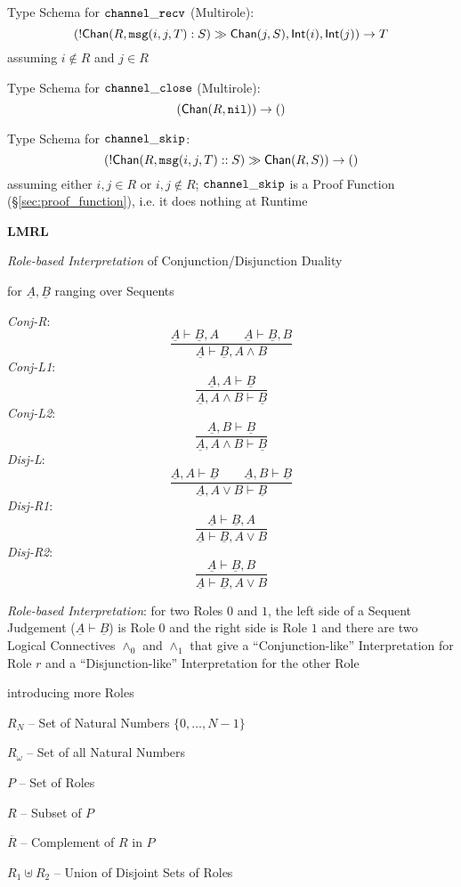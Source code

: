 Type Schema for $\mathtt{channel\_recv}$ (Multirole):
\[
  (!\mathsf{Chan} (R, \mathtt{msg}(i,j,T):S) \gg \mathsf{Chan}(j,S), \mathsf{Int}(i), \mathsf{Int}(j))
    \rightarrow T
\]
assuming $i \notin R$ and $j \in R$

Type Schema for $\mathtt{channel\_close}$ (Multirole):
\[
  (\mathsf{Chan}(R, \mathtt{nil})) \rightarrow \mathsf{()}
\]

Type Schema for $\mathtt{channel\_skip}$:
\[
  (!\mathsf{Chan}(R,\mathtt{msg}(i,j,T)::S) \gg \mathsf{Chan}(R,S)) \rightarrow \mathsf{()}
\]
assuming either $i,j \in R$ or $i,j \notin R$; $\mathtt{channel\_skip}$ is a
Proof Function (\S\ref{sec:proof_function}), i.e. it does nothing at
Runtime


\textbf{LMRL}

\emph{Role-based Interpretation} of Conjunction/Disjunction Duality

for $\underline{A},\underline{B}$ ranging over Sequents

\emph{Conj-R}:
\[
  \frac {\underline{A} \vdash \underline{B},A \quad\quad
    \underline{A} \vdash \underline{B},B}
  {\underline{A} \vdash \underline{B},A \wedge B}
\]
\emph{Conj-L1}:
\[
  \frac {\underline{A},A \vdash \underline{B}}
  {\underline{A},A \wedge B \vdash \underline{B}}
\]
\emph{Conj-L2}:
\[
  \frac {\underline{A},B \vdash \underline{B}}
  {\underline{A},A \wedge B \vdash \underline{B}}
\]
\emph{Disj-L}:
\[
  \frac {\underline{A},A \vdash \underline{B} \quad\quad
    \underline{A},B \vdash \underline{B}}
  {\underline{A},A \vee B \vdash \underline{B}}
\]
\emph{Disj-R1}:
\[
  \frac {\underline{A} \vdash \underline{B},A}
  {\underline{A} \vdash \underline{B}, A \vee B}
\]
\emph{Disj-R2}:
\[
  \frac {\underline{A} \vdash \underline{B},B}
  {\underline{A} \vdash \underline{B}, A \vee B}
\]

\emph{Role-based Interpretation}: for two Roles $0$ and $1$, the left
side of a Sequent Judgement ($\underline{A} \vdash \underline{B}$) is
Role $0$ and the right side is Role $1$ and there are two Logical
Connectives $\wedge_0$ and $\wedge_1$ that give a ``Conjunction-like''
Interpretation for Role $r$ and a ``Disjunction-like'' Interpretation
for the other Role

introducing more Roles

$R_N$ -- Set of Natural Numbers $\{0,\ldots,N-1\}$

$R_\omega$ -- Set of all Natural Numbers

$P$ -- Set of Roles

$R$ -- Subset of $P$

$\overline{R}$ -- Complement of $R$ in $P$

$R_1 \uplus R_2$ -- Union of Disjoint Sets of Roles


